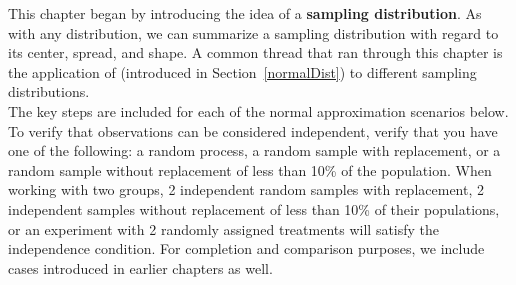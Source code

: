 
\reviewchapterheader{}

\noindent This chapter began by introducing the idea of a \textbf{sampling distribution}.  As with any distribution, we can summarize a sampling distribution with regard to its center, spread, and shape.  A common thread that ran through this chapter is the application of  (introduced in Section~\ref{normalDist}) to different sampling distributions.
\\

\noindent The key steps are included for each of the normal approximation scenarios below.  To verify that observations can be considered independent, verify that you have one of the following: a random process, a random sample with replacement, or a random sample without replacement of less than 10\% of the population.  When working with two groups, 2 independent random samples with replacement, 2 independent samples without replacement of less than 10\% of their populations, or an experiment with 2 randomly assigned treatments will satisfy the independence condition.  For completion and comparison purposes, we include cases introduced in earlier chapters as well.

